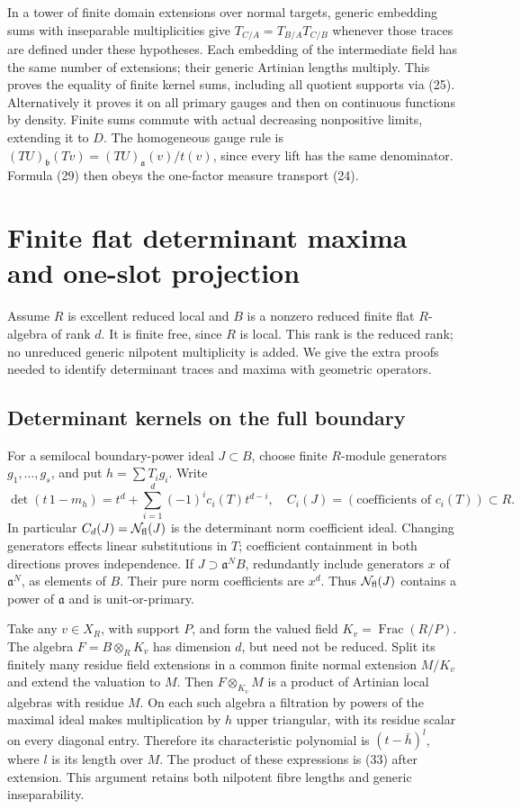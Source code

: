 In a tower of finite domain extensions over normal targets,
generic embedding sums with inseparable multiplicities give
\(T_{C/A}=T_{B/A}T_{C/B}\) whenever those traces are defined
under these hypotheses. Each embedding of the intermediate
field has the same number of extensions; their generic
Artinian lengths multiply. This proves the equality of
finite kernel sums, including all quotient supports via
(25). Alternatively it proves it on all primary gauges
and then on continuous functions by density. Finite sums
commute with actual decreasing nonpositive limits, extending
it to \(D\). The homogeneous gauge rule is
\((TU)_{\mathfrak b}(Tv)=(TU)_{\mathfrak a}(v)/t(v)\), since
every lift has the same denominator. Formula (29) then
obeys the one-factor measure transport (24).

\section{Finite flat determinant maxima and one-slot projection}
\label{sec:flat}
Assume \(R\) is excellent reduced local and \(B\) is a nonzero
reduced finite flat \(R\)-algebra of rank \(d\). It is finite free,
since \(R\) is local. This rank is the reduced rank; no
unreduced generic nilpotent multiplicity is added.
We give the extra proofs needed to identify determinant traces
and maxima with geometric operators.

\subsection*{Determinant kernels on the full boundary}
For a semilocal boundary-power ideal \(J\subset B\), choose finite
\(R\)-module generators \(g_1,\ldots,g_s\), and put
\(h=\sum T_i g_i\). Write
\[
 \det(t\,1-m_h)=t^d+\sum_{i=1}^d(-1)^i c_i(T)t^{d-i},\quad
 C_i(J)=(\text{coefficients of }c_i(T))\subset R.
                                                               \tag{33}
\]
In particular \(C_d(J)=\mathcal N_{\rm fl}(J)\) is the
determinant norm coefficient ideal.
Changing generators effects linear substitutions in \(T\);
coefficient containment in both directions proves independence.
If \(J\supset\mathfrak a^N B\), redundantly include generators
\(x\) of \(\mathfrak a^N\), as elements of \(B\).
Their pure norm coefficients are \(x^d\). Thus
\(\mathcal N_{\rm fl}(J)\) contains a power of \(\mathfrak a\)
and is unit-or-primary.

Take any \(v\in X_R\), with support \(P\), and form the valued
field \(K_v=\operatorname{Frac}(R/P)\).
The algebra \(F=B\otimes_R K_v\) has dimension \(d\), but need
not be reduced. Split its finitely many residue field
extensions in a common finite normal extension \(M/K_v\)
and extend the valuation to \(M\).
Then \(F\otimes_{K_v}M\) is a product of Artinian local
algebras with residue \(M\). On each such algebra a filtration
by powers of the maximal ideal makes multiplication by \(h\)
upper triangular, with its residue scalar on every diagonal
entry. Therefore its characteristic polynomial is
\((t-\bar h)^{l}\), where \(l\) is its length over \(M\).
The product of these expressions is (33) after extension.
This argument retains both nilpotent fibre lengths and
generic inseparability.

